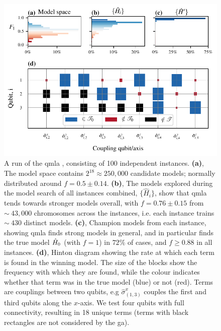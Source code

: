 \par 
\begin{figure}
    \begin{center}
        \includegraphics{theoretical_study/figures/gen_alg_run.pdf}
    \end{center}
    \caption[\Gls{run} of \gls{qmla} ]{
        A \gls{run} of the \gls{qmla} , consisting of 100 independent \glspl{instance}.
        \textbf{(a)}, The \gls{model space} contains $2^{18}\approx250,000$ candidate models; 
            normally distributed around $f=0.5 \pm 0.14$. 
        \textbf{(b)}, The models explored during the model search of all \glspl{instance} combined, 
            $\{\hat{H}_i\}$, show that \gls{qmla} tends towards stronger models overall, 
            with $f = 0.76 \pm 0.15$ from $\sim~43,000$ chromosomes across the instances, 
            i.e. each \gls{instance} trains $\sim~430$ distinct models. 
        \textbf{(c)}, Champion models from each instance, showing \gls{qmla} finds strong models 
            in general, and in particular finds the \gls{true model} $\hat{H}_0$ (with $f=1$) in $72\%$ of cases, 
            and $f \geq 0.88$ in all instances. 
        \textbf{(d)}, Hinton diagram showing the rate at which each term is found in the winning model. 
            The size of the blocks show the frequency with which they are found, while the colour indicates 
            whether that term was in the \gls{true model} (blue) or not (red).
            Terms are couplings between two qubits, e.g $\hat{\sigma}_{(1, 3)}^{x}$ 
                couples the first and third qubits along the $x$-axis. 
            We test four qubits with full connectivity, resulting in 18 unique terms 
            (terms with black rectangles are not considered by the \gls{ga}).
}
    \label{fig:ga_run}
\end{figure}

